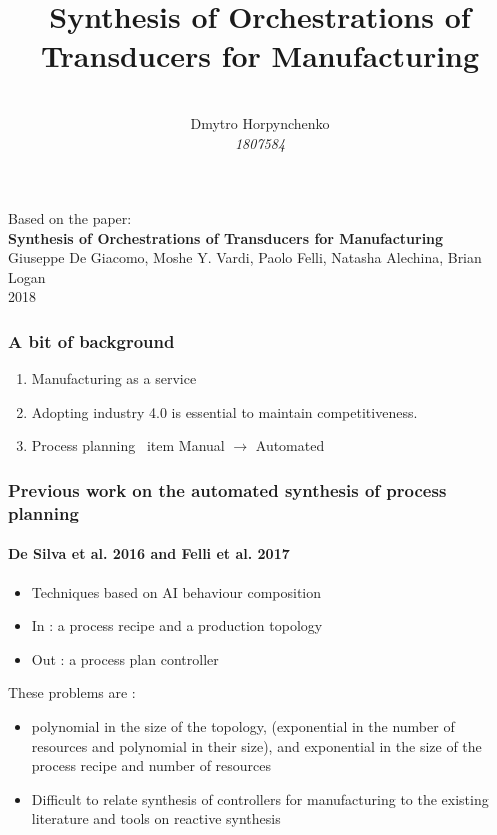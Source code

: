 \documentclass{beamer}
\title{\textbf{Synthesis of Orchestrations of Transducers for Manufacturing}}
\author[Dmytro]{
\\
\vspace{5.5cm}
Dmytro Horpynchenko\\
\textit{1807584}}
\date[May 13, 2019]{}
\institute[Roma]{Università di Roma}
\theoremstyle{definition}
\theoremstyle{plain}
\begin{document}
\titlepageframe %

\begin{frame}
Based on the paper:
\\
\textbf{Synthesis of Orchestrations of Transducers for Manufacturing}
\\
Giuseppe De Giacomo, Moshe Y. Vardi, Paolo Felli, Natasha Alechina, Brian Logan
\\
2018
\end{frame}

\begin{frame}
\frametitle{A bit of background
}
\begin{enumerate}
    \item Manufacturing as a service
    \item Adopting industry 4.0 is essential to maintain competitiveness. 
    \item Process planning   
\   item Manual $\rightarrow$ Automated
\end{enumerate}
\end{frame}

\begin{frame}
\frametitle{Previous work on the automated synthesis of process planning
}
\framesubtitle{De Silva et al. 2016 and Felli et al. 2017}
\begin{itemize}
 \item Techniques based on AI behaviour composition 
 \item In : a process recipe and a production topology 
 \item Out : a process plan controller 
 \end{itemize}
 \alert{These problems are :} 
 \begin{itemize}
     \item polynomial in the size of the topology, (exponential in the number of resources and polynomial in their size), and exponential in the size of the process recipe and number of resources
     \item Difficult to relate synthesis of controllers for manufacturing to the existing literature and tools on reactive synthesis
 \end{itemize}
 \end{frame}
 
\end{document}
